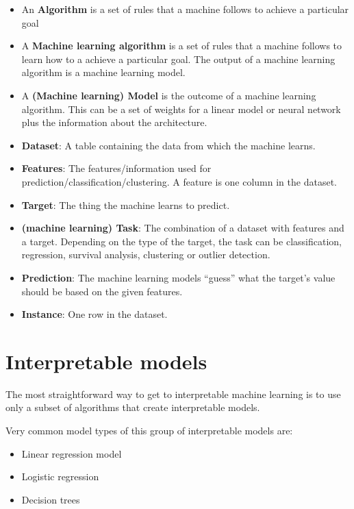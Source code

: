 \documentclass[12pt,]{krantz}
\providecommand{\tightlist}{%
  \setlength{\itemsep}{0pt}\setlength{\parskip}{0pt}}
\theoremstyle{definition}
\theoremstyle{definition}
\theoremstyle{definition}
\theoremstyle{remark}
\begin{document}
\begin{itemize}
\tightlist
\item
  An \textbf{Algorithm} is a set of rules that a machine follows to
  achieve a particular goal \citep{algorithm}
\item
  A \textbf{Machine learning algorithm} is a set of rules that a machine
  follows to learn how to a achieve a particular goal. The output of a
  machine learning algorithm is a machine learning model.
\item
  A \textbf{(Machine learning) Model} is the outcome of a machine
  learning algorithm. This can be a set of weights for a linear model or
  neural network plus the information about the architecture.
\item
  \textbf{Dataset}: A table containing the data from which the machine
  learns.
\item
  \textbf{Features}: The features/information used for
  prediction/classification/clustering. A feature is one column in the
  dataset.
\item
  \textbf{Target}: The thing the machine learns to predict.
\item
  \textbf{(machine learning) Task}: The combination of a dataset with
  features and a target. Depending on the type of the target, the task
  can be classification, regression, survival analysis, clustering or
  outlier detection.
\item
  \textbf{Prediction}: The machine learning models ``guess'' what the
  target's value should be based on the given features.
\item
  \textbf{Instance}: One row in the dataset.
\end{itemize}

\chapter{Interpretable models}\label{simple}

The most straightforward way to get to interpretable machine learning is
to use only a subset of algorithms that create interpretable models.

Very common model types of this group of interpretable models are:

\begin{itemize}
\tightlist
\item
  Linear regression model
\item
  Logistic regression
\item
  Decision trees
\end{itemize}
\end{document}
